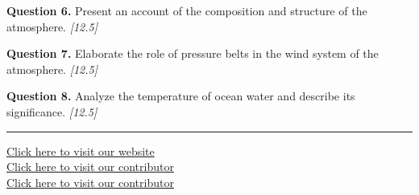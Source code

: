 \documentclass[11pt,a4paper]{article}
\newcommand{\pts}[1]{\hfill   \textit{[#1]}}
\begin{document}
\noindent   \textbf{Question 6.} Present an account of the composition and structure of the atmosphere. \pts{12.5}

\medskip


\noindent   \textbf{Question 7.} Elaborate the role of pressure belts in the wind system of the atmosphere. \pts{12.5}

\medskip


\noindent   \textbf{Question 8.} Analyze the temperature of ocean water and describe its significance. \pts{12.5}

\vfill\rule{\linewidth}{0.4pt}

\begin{center}\small
\href{https://bhu-exam.vercel.app/}{Click here to visit our website}\\[4pt]
\href{https://me-aryan.vercel.app/}{Click here to visit our contributor}\\[4pt]
\href{https://quashan-me.vercel.app/}{Click here to visit our contributor}
\end{center}
\end{document}
